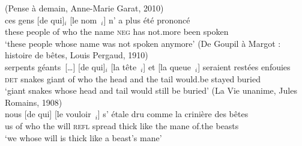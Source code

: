 \ex (Pense à demain, Anne-Marie Garat, 2010)\\
\gll ces gens [de qui]$_i$ [le nom~\trace{}$_i$] n' a plus été prononcé\\
these people of who the name \textsc{neg} has not.more been spoken \\
\glt `these people whose name was not spoken anymore'
\label{ex:dq2000-subj-passive}
\ex (De Goupil à Margot : histoire de bêtes, Louis Pergaud, 1910)\\
\gll [des] serpents géants~[\dots] [de qui]$_i$ [la tête~\trace{}$_i$] et [la queue~\trace{}$_i$] seraient restées enfouies\\
\textsc{det} snakes giant of who the head and the tail would.be stayed buried\\
\glt `giant snakes whose head and tail would still be buried'
\label{ex:dq1900-subj-unacc}
\ex (La Vie unanime, Jules Romains, 1908)\\
\gll nous [de qui] [le vouloir~\trace{}$_i$] s' étale dru comme la crinière des bêtes\\
us of who the will \textsc{refl} spread thick like the mane of.the beasts\\
\glt `we whose will is thick like a beast's mane'
\label{ex:dq1900-subj-medio}
\zl 

